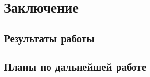 \section{Заключение}
\label{sec:chapter_5}

\subsection{Результаты работы}

\subsection{Планы по дальнейшей работе}

\newpage